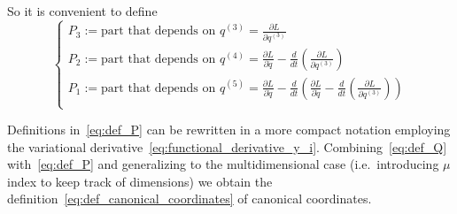 So it is convenient to define
\begin{equation}\label{eq:def_P}
  \begin{cases}
    P_3 := \text{part that depends on } q^{(3)}
         = \frac{\partial L}{\partial q^{(3)}} \\
    P_2 := \text{part that depends on } q^{(4)}
         = \frac{\partial L}{\partial \ddot{q}} -
           \frac{d}{dt} \left(
             \frac{\partial L}{\partial q^{(3)}}
           \right) \\
    P_1 := \text{part that depends on } q^{(5)}
         = \frac{\partial L}{\partial \dot{q}} -
           \frac{d}{dt} \left(
             \frac{\partial L}{\partial \ddot{q}} -
             \frac{d}{dt} \left(
               \frac{\partial L}{\partial q^{(3)}}
              \right)
            \right) \\
  \end{cases}
\end{equation}

Definitions in~\eqref{eq:def_P} can be rewritten in a more compact notation
employing the variational derivative~\eqref{eq:functional_derivative_y_i}.
Combining~\eqref{eq:def_Q} with~\eqref{eq:def_P} and generalizing to the
multidimensional case (i.e.\ introducing $\mu$ index to keep track of
dimensions) we obtain the definition~\eqref{eq:def_canonical_coordinates} of
canonical coordinates.
